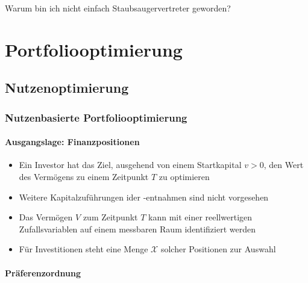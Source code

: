\documentclass[12pt]{report}
\theoremstyle{dotless}
\theoremstyle{definition}
\begin{document}
\begin{titlepage}
	Warum bin ich nicht einfach Staubsaugervertreter geworden?
\end{titlepage}

\tableofcontents

\chapter{Portfoliooptimierung}

\section{Nutzenoptimierung}

\subsection{Nutzenbasierte Portfoliooptimierung}

\subsubsection{Ausgangslage: Finanzpositionen}
\begin{itemize}
	\item Ein Investor hat das Ziel, ausgehend von einem Startkapital $v>0$, den Wert des Verm\"ogens zu einem Zeitpunkt $T$ zu optimieren
	\item Weitere Kapitalzuf\"uhrungen ider -entnahmen sind nicht vorgesehen
	\item Das Verm\"ogen $V$ zum Zeitpunkt $T$ kann mit einer reellwertigen Zufallsvariablen auf einem messbaren Raum identifiziert werden
	\item F\"ur Investitionen steht eine Menge $\mathcal{X}$ solcher Positionen zur Auswahl
\end{itemize}

\subsubsection{Pr\"aferenzordnung}
\end{document}
